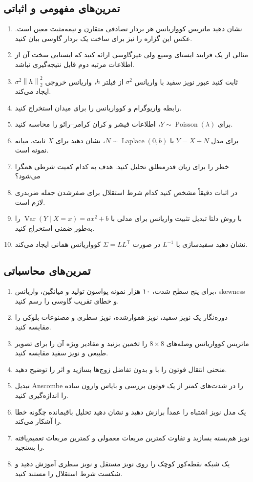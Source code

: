 \documentclass[12pt,openany,oneside]{book}
\newcommand{\Var}{\operatorname{Var}}
\newcommand{\norm}[1]{\left\lVert #1\right\rVert}
\newcommand{\trans}{^{\mathsf T}}
\newcommand{\Poisson}{\operatorname{Poisson}}
\begin{document}
\subsection*{تمرین‌های مفهومی و اثباتی}
\begin{enumerate}
\item نشان دهید ماتریس کوواریانس هر بردار تصادفی متقارن و نیمه‌مثبت معین است. عکس این گزاره را نیز برای ساخت یک بردار گاوسی بیان کنید.
\item مثالی از یک فرایند ایستای وسیع ولی غیرگاوسی ارائه کنید که ایستایی سخت آن از اطلاعات مرتبه دوم قابل نتیجه‌گیری نباشد.
\item ثابت کنید عبور نویز سفید با واریانس \(\sigma^2\) از فیلتر \(h\)، واریانس خروجی \(\sigma^2\norm h_2^2\) ایجاد می‌کند.
\item رابطه واریوگرام و کوواریانس را برای میدان  استخراج کنید.
\item برای \(Y\sim\Poisson(\lambda)\)، اطلاعات فیشر و کران کرامر--رائو را محاسبه کنید.
\item برای مدل \(Y=X+N\) با \(N\sim\operatorname{Laplace}(0,b)\)، نشان دهید  برای \(X\) ثابت، میانه نمونه است.
\item خطر  را برای زیان قدرمطلق تحلیل کنید. هدف به کدام کمیت شرطی همگرا می‌شود؟
\item در اثبات  دقیقاً مشخص کنید کدام شرط استقلال برای صفرشدن جمله ضربدری لازم است.
\item با روش دلتا تبدیل تثبیت واریانس برای مدلی با \(\Var(Y\mid X=x)=ax^2+b\) را به‌طور ضمنی استخراج کنید.
\item نشان دهید سفیدسازی با \(L^{-1}\) در صورت \(\Sigma=LL\trans\) کوواریانس همانی ایجاد می‌کند.
\end{enumerate}

\subsection*{تمرین‌های محاسباتی}
\begin{enumerate}
\item برای پنج سطح شدت، ۱۰ هزار نمونه پواسون تولید و میانگین، واریانس، skewness و خطای تقریب گاوسی را رسم کنید.
\item دوره‌نگار یک نویز سفید، نویز هموارشده، نویز سطری و مصنوعات بلوکی  را مقایسه کنید.
\item ماتریس کوواریانس وصله‌های \(8\times8\) را تخمین بزنید و مقادیر ویژه آن را برای تصویر طبیعی و نویز سفید مقایسه کنید.
\item منحنی انتقال فوتون را با و بدون تفاضل زوج‌ها بسازید و اثر  را توضیح دهید.
\item تبدیل Anscombe را در شدت‌های کمتر از یک فوتون بررسی و بایاس وارون ساده را اندازه‌گیری کنید.
\item یک مدل نویز اشتباه را عمداً برازش دهید و نشان دهید تحلیل باقیمانده چگونه خطا را آشکار می‌کند.
\item نویز هم‌بسته بسازید و تفاوت کمترین مربعات معمولی و کمترین مربعات تعمیم‌یافته را بسنجید.
\item یک شبکه نقطه‌کور کوچک را روی نویز مستقل و نویز سطری آموزش دهید و شکست شرط استقلال را مستند کنید.
\end{enumerate}
\end{document}
